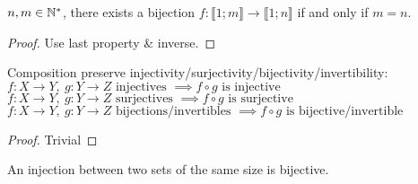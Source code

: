 \begin{property}
	$n,m \in \mathbb{N}^*$, there exists a bijection $f:\llbracket 1;m \rrbracket \rightarrow \llbracket 1;n \rrbracket$ if and only if $m=n$.
\end{property}
\begin{proof}
	Use last property \& inverse.
\end{proof}
\begin{property}[Compositions]
	Composition preserve injectivity/surjectivity/bijectivity/invertibility:
	$f: X \to Y, \ g: Y \to Z \text{ injectives } \implies f \circ g \text{ is injective}$\\
	$f: X \to Y, \ g: Y \to Z \text{ surjectives } \implies f \circ g \text{ is surjective}$\\
	$f: X \to Y, \ g: Y \to Z \text{ bijections/invertibles } \implies f \circ g \text{ is bijective/invertible}$
\end{property}
\begin{proof}
	Trivial
\end{proof}
\begin{property}
	An injection between two sets of the same size is bijective.
\end{property}

